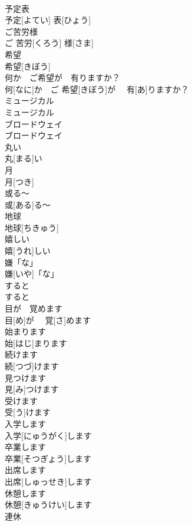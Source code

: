 \documentclass[8pt]{extreport}
\begin{document}
\begin{CJK}{UTF8}{min}
\\	予定表	
\\	予定[よてい] 表[ひょう]	
\\	ご苦労様	
\\	ご 苦労[くろう] 様[さま]	
\\	希望	
\\	希望[きぼう]	
\\	何か　ご希望が　有りますか？	
\\	何[なに]か　ご 希望[きぼう]が　 有[あ]りますか？	
\\	ミュージカル	
\\	ミュージカル	
\\	ブロードウェイ	
\\	ブロードウェイ	
\\	丸い	
\\	丸[まる]い	
\\	月	
\\	月[つき]	
\\	或る〜	
\\	或[ある]る〜	
\\	地球	
\\	地球[ちきゅう]	
\\	嬉しい	
\\	嬉[うれ]しい	
\\	嫌「な」	
\\	嫌[いや]「な」	
\\	すると	
\\	すると	
\\	目が　覚めます
\\	目[め]が　 覚[さ]めます
\\	始まります	
\\	始[はじ]まります	
\\	続けます	
\\	続[つづ]けます	
\\	見つけます	
\\	見[み]つけます	
\\	受けます	
\\	受[う]けます	
\\	入学します	
\\	入学[にゅうがく]します	
\\	卒業します	
\\	卒業[そつぎょう]します	
\\	出席します	
\\	出席[しゅっせき]します	
\\	休憩します	
\\	休憩[きゅうけい]します	
\\	連休	

\end{CJK}
\end{document}
